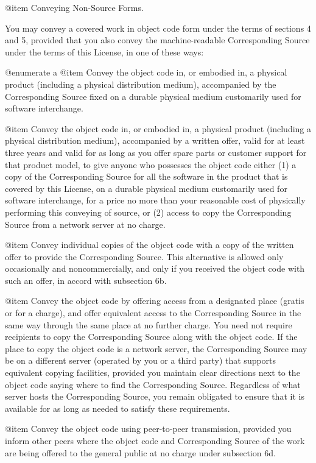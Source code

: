 @item  Conveying Non-Source Forms.

You may convey a covered work in object code form under the terms of
sections 4 and 5, provided that you also convey the machine-readable
Corresponding Source under the terms of this License, in one of these
ways:

@enumerate a
@item
Convey the object code in, or embodied in, a physical product
(including a physical distribution medium), accompanied by the
Corresponding Source fixed on a durable physical medium customarily
used for software interchange.

@item
Convey the object code in, or embodied in, a physical product
(including a physical distribution medium), accompanied by a written
offer, valid for at least three years and valid for as long as you
offer spare parts or customer support for that product model, to give
anyone who possesses the object code either (1) a copy of the
Corresponding Source for all the software in the product that is
covered by this License, on a durable physical medium customarily used
for software interchange, for a price no more than your reasonable
cost of physically performing this conveying of source, or (2) access
to copy the Corresponding Source from a network server at no charge.

@item
Convey individual copies of the object code with a copy of the written
offer to provide the Corresponding Source.  This alternative is
allowed only occasionally and noncommercially, and only if you
received the object code with such an offer, in accord with subsection
6b.

@item
Convey the object code by offering access from a designated place
(gratis or for a charge), and offer equivalent access to the
Corresponding Source in the same way through the same place at no
further charge.  You need not require recipients to copy the
Corresponding Source along with the object code.  If the place to copy
the object code is a network server, the Corresponding Source may be
on a different server (operated by you or a third party) that supports
equivalent copying facilities, provided you maintain clear directions
next to the object code saying where to find the Corresponding Source.
Regardless of what server hosts the Corresponding Source, you remain
obligated to ensure that it is available for as long as needed to
satisfy these requirements.

@item
Convey the object code using peer-to-peer transmission, provided you
inform other peers where the object code and Corresponding Source of
the work are being offered to the general public at no charge under
subsection 6d.

